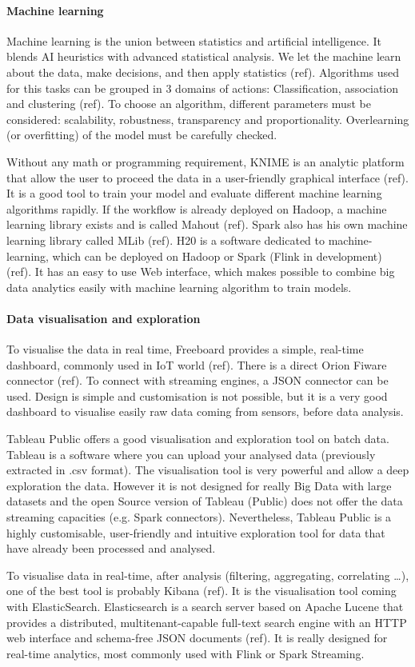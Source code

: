 \paragraph{Machine learning}

Machine learning is the union between statistics and artificial intelligence.
It blends AI heuristics with advanced statistical analysis.
We let the machine learn about the data, make decisions, and then apply statistics (ref).
Algorithms used for this tasks can be grouped in 3 domains of actions: Classification, association and clustering (ref).
To choose an algorithm, different parameters must be considered: scalability, robustness, transparency and proportionality.
Overlearning (or overfitting) of the model must be carefully checked.

Without any math or programming requirement, KNIME is an analytic platform that allow the user to proceed the data in a user-friendly graphical interface (ref).
It is a good tool to train your model and evaluate different machine learning algorithms rapidly.
If the workflow is already deployed on Hadoop, a machine learning library exists and is called Mahout (ref).
Spark also has his own machine learning library called MLib (ref).
H20 is a software dedicated to machine-learning, which can be deployed on Hadoop or Spark (Flink in development) (ref).
It has an easy to use Web interface, which makes possible to combine big data analytics easily with machine learning algorithm to train models.

\paragraph{Data visualisation and exploration}

To visualise the data in real time, Freeboard provides a simple, real-time dashboard, commonly used in IoT world (ref).
There is a direct Orion Fiware connector (ref).
To connect with streaming engines, a JSON connector can be used.
Design is simple and customisation is not possible, but it is a very good dashboard to visualise easily raw data coming from sensors, before data analysis.

Tableau Public offers a good visualisation and exploration tool on batch data.
Tableau is a software where you can upload your analysed data (previously extracted in .csv format).
The visualisation tool is very powerful and allow a deep exploration the data.
However it is not designed for really Big Data with large datasets and the open Source version of Tableau (Public) does not offer the data streaming capacities (e.g. Spark connectors).
Nevertheless, Tableau Public is a highly customisable, user-friendly and intuitive exploration tool for data that have already been processed and analysed.

To visualise data in real-time, after analysis (filtering, aggregating, correlating …), one of the best tool is probably Kibana (ref).
It is the visualisation tool coming with ElasticSearch.
Elasticsearch is a search server based on Apache Lucene that provides a distributed, multitenant-capable full-text search engine with an HTTP web interface and schema-free JSON documents (ref).
It is really designed for real-time analytics, most commonly used with Flink or Spark Streaming.

